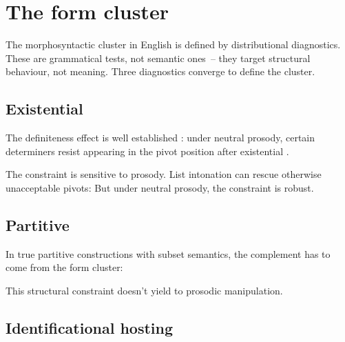 \section{The form cluster}
\label{sec:10:form-cluster}

The morphosyntactic cluster in English is defined by distributional diagnostics. These are grammatical tests, not semantic ones~-- they target structural behaviour, not meaning. Three diagnostics converge to define the cluster.

\subsection{Existential }
\label{sec:10:existential-there}

The definiteness effect is well established \citep{milsark1977}: under neutral prosody, certain determiners resist appearing in the pivot position after existential .

\z
{}
\z

The constraint is sensitive to prosody. List intonation can rescue otherwise unacceptable pivots:  But under neutral prosody, the constraint is robust.

\subsection{Partitive }
\label{sec:10:partitive-of}

In true partitive constructions with subset semantics, the complement has to come from the form cluster:

\z
{}
\z
{}
\z

This structural constraint doesn't yield to prosodic manipulation.

\subsection{Identificational hosting}
\label{sec:10:identificational}

